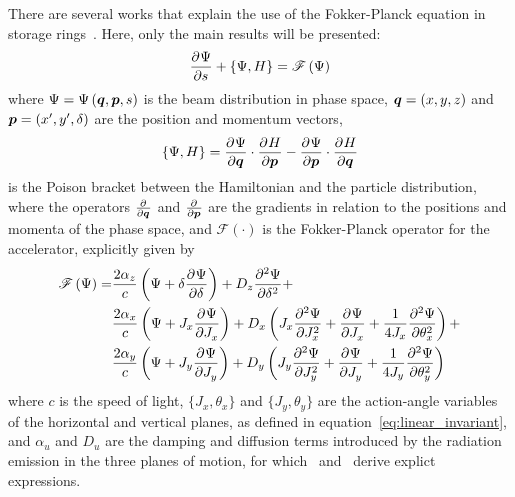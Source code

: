     There are several works that explain the use of the Fokker-Planck equation in storage rings~\cite{Lindberg2016,Suzuki1983,Suzuki1986,Lee1999,Wiedemann2007}. Here, only the main results will be presented:
    \begin{align}\label{eq:fokker_planck_equation}
        \derpar{\Psi}{s} + \poison{\Psi, H} = \mathscr{F}\fof{\Psi}
    \end{align}
    where $\Psi = \Psi\fof{\vect{q},\vect{p}, s}$ is the beam distribution in phase space, $\vect{q}=(x,y,z)$ and $\vect{p}=(x',y',\delta)$ are the position and momentum vectors,
    \begin{align}
        \poison{\Psi, H} = \derpar{\Psi}{\vect{q}}\cdot\derpar{H}{\vect{p}} -
                           \derpar{\Psi}{\vect{p}}\cdot\derpar{H}{\vect{q}}
    \end{align}
    is the Poison bracket between the Hamiltonian and the particle distribution, where the operators $\derpar{}{\vect{q}}$ and $\derpar{}{\vect{p}}$ are the gradients in relation to the positions and momenta of the phase space, and $\mathscr{F}(\cdot)$ is the Fokker-Planck operator for the accelerator, explicitly given by~\cite[eq. 33]{Lindberg2016}
    \begin{align}\nonumber
        \mathscr{F}\fof{\Psi} = & \frac{2\alpha_z}{c}\fof{
                                            \Psi + \delta\derpar{\Psi}{\delta}
                                      } + D_z \derpar[2]{\Psi}{\delta} + \\\nonumber
                                   & \frac{2\alpha_x}{c}\fof{
                                         \Psi + J_x\derpar{\Psi}{J_x}
                                     } + D_x \fof{J_x\derpar[2]{\Psi}{J_x} +
                                                 \derpar{\Psi}{J_x} +
                                                 \frac{1}{4J_x}\derpar[2]{\Psi}{\theta_x}
                                          } + \\
                                   & \frac{2\alpha_y}{c}\fof{
                                        \Psi + J_y\derpar{\Psi}{J_y}
                                     } + D_y \fof{J_y\derpar[2]{\Psi}{J_y} +
                                                 \derpar{\Psi}{J_y} +
                                                 \frac{1}{4J_y}\derpar[2]{\Psi}{\theta_y}
                                         }
    \end{align}
    where $c$ is the speed of light, $\{J_x, \theta_x\}$ and $\{J_y, \theta_y\}$ are the action-angle variables of the horizontal and vertical planes, as defined in equation~\eqref{eq:linear_invariant}, and $\alpha_u$ and $D_u$ are the damping and diffusion terms introduced by the radiation emission in the three planes of motion, for which~ and~ derive explict expressions.

